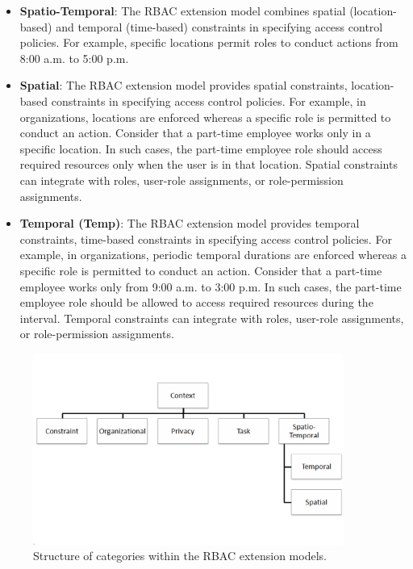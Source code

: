\begin{itemize}
  \item \textbf{Spatio-Temporal}: The RBAC extension model combines spatial (location-based) and temporal (time-based) constraints in specifying access control policies. For example, specific locations permit roles to conduct actions from 8:00 a.m. to 5:00 p.m.

  \item \textbf{Spatial}: The RBAC extension model provides spatial constraints, location-based constraints in specifying access
	control policies. For example, in organizations, locations are enforced whereas a
	specific role is permitted to conduct an action. Consider that a part-time employee works only in a specific location.
	In such cases, the part-time employee role should access required resources only when the user is in that location. 
	Spatial constraints can integrate with roles, user-role assignments, or role-permission assignments. 

  \item \textbf{Temporal (Temp)}:  The RBAC extension model provides temporal constraints, time-based constraints in specifying access
	control policies. For example, in organizations, periodic temporal durations are enforced whereas a
	specific role is permitted to conduct an action. Consider that a part-time employee works only from 9:00 a.m. to 3:00 p.m.
	In such cases, the part-time employee role should be allowed to access required resources during the interval. 
	Temporal constraints can integrate with roles, user-role assignments, or role-permission assignments.   
	
\end{itemize}

\begin{figure}[ht]
    \centering
        \includegraphics[width=4.0in]{sections/category_structrure.png}
\vspace{-0.2 in}
    \caption{\label{fig:category_structrure}Structure of categories within the RBAC extension models.}
\end{figure}

